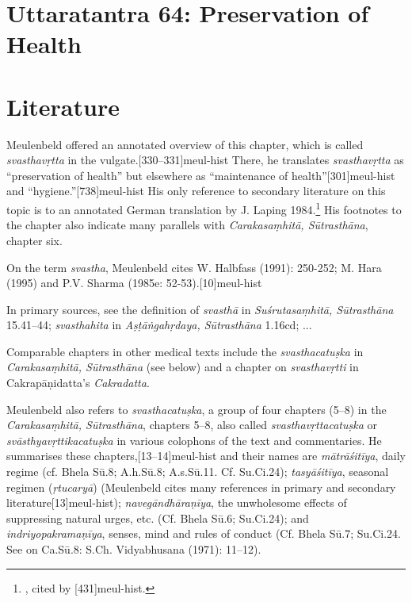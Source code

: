 
\section{Uttaratantra 64: Preservation of Health}%

\section{Literature}

Meulenbeld offered an annotated overview of this chapter, which is called 
\emph{svasthavṛtta} in the vulgate.[330--331]{meul-hist} There, 
he translates \emph{svasthavṛtta} as ``preservation of health'' but elsewhere 
as ``maintenance of health''[301]{meul-hist} and 
``hygiene.''[738]{meul-hist} His only reference to secondary 
literature on this topic is to an annotated German translation by J. Laping 
1984.\footnote{\cite{lapi-1984}, cited by [431]{meul-hist}.} His 
footnotes to the chapter also indicate 
many parallels with \emph{Carakasaṃhitā, Sūtrasthāna}, chapter six.

On the term \emph{svastha}, Meulenbeld cites W. Halbfass (1991): 250-252; M. 
Hara (1995) and P.V. Sharma (1985e: 52-53).[10]{meul-hist}

In primary sources, see the definition of \emph{svasthā} in 
\emph{Suśrutasaṃhitā, Sūtrasthāna} 15.41--44; \emph{svasthahita} in 
\emph{Aṣṭāṅgahṛdaya, Sūtrasthāna} 1.16cd; ...

Comparable chapters in other medical texts include the \emph{svasthacatuṣka} 
in \emph{Carakasaṃhitā, Sūtrasthāna} (see below) and a chapter on 
\emph{svasthavṛtti} in Cakrapāṇidatta's \emph{Cakradatta}.

Meulenbeld also refers to \emph{svasthacatuṣka}, a group of four chapters 
(5--8) in the \emph{Carakasaṃhitā, Sūtrasthāna}, chapters 5–8, also called 
\emph{svasthavṛttacatuṣka} or \emph{svāsthyavṛttikacatuṣka} in various 
colophons of the text and commentaries. He summarises these 
chapters,[13--14]{meul-hist} and their names are 
\emph{mātrāśitīya}, daily regime (cf. Bhela Sū.8; A.h.Sū.8; A.s.Sū.11. Cf. 
Su.Ci.24); \emph{tasyāśitīya}, seasonal regimen (\emph{ṛtucaryā}) 
(Meulenbeld cites many references in primary and secondary 
literature[13]{meul-hist}); \emph{navegāndhāraṇīya}, the 
unwholesome effects of suppressing natural urges, etc. (Cf. Bhela Sū.6; 
Su.Ci.24); and \emph{indriyopakramaṇīya}, senses, mind and rules of conduct 
(Cf. Bhela Sū.7; Su.Ci.24. See on Ca.Sū.8: S.Ch. Vidyabhusana (1971): 11--12).

